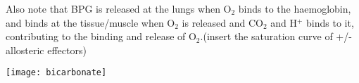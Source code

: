 Also note that BPG is released at the lungs when O$_2$ binds to the haemoglobin, and binds at the tissue/muscle when O$_2$ is released and CO$_2$ and H$^+$ binds to it, contributing to the binding and release of O$_2$.(insert the saturation curve of +/- allosteric effectors)

\texttt{[image: bicarbonate]}
